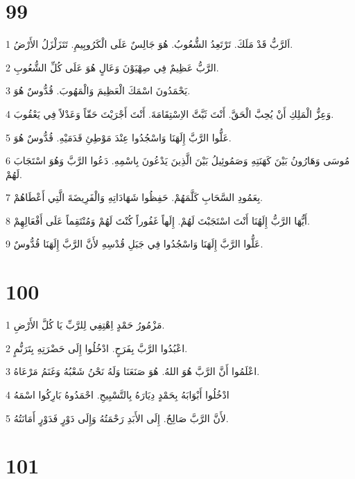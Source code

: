 \chapter{99}

\par 1 اَلرَّبُّ قَدْ مَلَكَ. تَرْتَعِدُ الشُّعُوبُ. هُوَ جَالِسٌ عَلَى الْكَرُوبِيمِ. تَتَزَلْزَلُ الأَرْضُ.
\par 2 الرَّبُّ عَظِيمٌ فِي صِهْيَوْنَ وَعَالٍ هُوَ عَلَى كُلِّ الشُّعُوبِ.
\par 3 يَحْمَدُونَ اسْمَكَ الْعَظِيمَ وَالْمَهُوبَ. قُدُّوسٌ هُوَ.
\par 4 وَعِزُّ الْمَلِكِ أَنْ يُحِبَّ الْحَقَّ. أَنْتَ ثَبَّتَّ الاِسْتِقَامَةَ. أَنْتَ أَجْرَيْتَ حَقّاً وَعَدْلاً فِي يَعْقُوبَ.
\par 5 عَلُّوا الرَّبَّ إِلَهَنَا وَاسْجُدُوا عِنْدَ مَوْطِئِ قَدَمَيْهِ. قُدُّوسٌ هُوَ.
\par 6 مُوسَى وَهَارُونُ بَيْنَ كَهَنَتِهِ وَصَمُوئِيلُ بَيْنَ الَّذِينَ يَدْعُونَ بِاسْمِهِ. دَعُوا الرَّبَّ وَهُوَ اسْتَجَابَ لَهُمْ.
\par 7 بِعَمُودِ السَّحَابِ كَلَّمَهُمْ. حَفِظُوا شَهَادَاتِهِ وَالْفَرِيضَةَ الَّتِي أَعْطَاهُمْ.
\par 8 أَيُّهَا الرَّبُّ إِلَهُنَا أَنْتَ اسْتَجَبْتَ لَهُمْ. إِلَهاً غَفُوراً كُنْتَ لَهُمْ وَمُنْتَقِماً عَلَى أَفْعَالِهِمْ.
\par 9 عَلُّوا الرَّبَّ إِلَهَنَا وَاسْجُدُوا فِي جَبَلِ قُدْسِهِ لأَنَّ الرَّبَّ إِلَهَنَا قُدُّوسٌ.

\chapter{100}

\par 1 مَزْمُورُ حَمْدٍ اِهْتِفِي لِلرَّبِّ يَا كُلَّ الأَرْضِ.
\par 2 اعْبُدُوا الرَّبَّ بِفَرَحٍ. ادْخُلُوا إِلَى حَضْرَتِهِ بِتَرَنُّمٍ.
\par 3 اعْلَمُوا أَنَّ الرَّبَّ هُوَ اللهُ. هُوَ صَنَعَنَا وَلَهُ نَحْنُ شَعْبُهُ وَغَنَمُ مَرْعَاهُ.
\par 4 ادْخُلُوا أَبْوَابَهُ بِحَمْدٍ دِيَارَهُ بِالتَّسْبِيحِ. احْمَدُوهُ بَارِكُوا اسْمَهُ
\par 5 لأَنَّ الرَّبَّ صَالِحٌ. إِلَى الأَبَدِ رَحْمَتُهُ وَإِلَى دَوْرٍ فَدَوْرٍ أَمَانَتُهُ.

\chapter{101}


